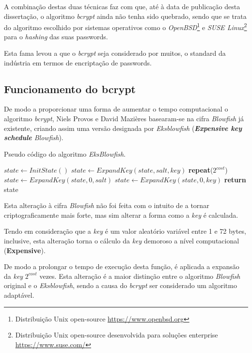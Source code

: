 A combinação destas duas técnicas faz com que, até à data de publicação desta dissertação, o algoritmo \emph{bcrypt} ainda não tenha sido quebrado, sendo que se trata do algoritmo escolhido por sistemas operativos como o \emph{OpenBSD}\footnote{Distribuição Unix open-source \url{https://www.openbsd.org}} e \emph{SUSE Linux}\footnote{Distribuição Unix open-source desenvolvida para soluções enterprise \url{https://www.suse.com/}} para o \emph{hashing} das suas passwords.

Esta fama levou a que o \emph{bcrypt} seja considerado por muitos, o standard da indústria em termos de encriptação de passwords.

\subsection{Funcionamento do bcrypt}

De modo a proporcionar uma forma de aumentar o tempo computacional o algoritmo \emph{bcrypt}, Niels Provos e David Mazières basearam-se na cifra \emph{Blowfish} já existente, criando assim uma versão designada por \emph{Eksblowfish} (\textit{\textbf{Expensive key schedule} Blowfish}).

\begin{algorithm}
    \caption{Pseudo código do algoritmo \emph{EksBlowfish}.}
    \begin{algorithmic}[1]
        \State $state\gets InitState()$
        \State $state\gets ExpandKey(state, salt, key)$
        \State \textbf{repeat}($2^{cost}$)
        \State \indent $state\gets ExpandKey(state, 0, salt)$
        \State \indent $state\gets ExpandKey(state, 0, key)$
        \State \textbf{return} state
    \EndFunction
    \end{algorithmic}
\end{algorithm}

Esta alteração à cifra \emph{Blowfish} não foi feita com o intuito de a tornar criptograficamente mais forte, mas sim alterar a forma como a \emph{key} é calculada.

Tendo em consideração que a \emph{key} é um valor aleatório variável entre 1 e 72 bytes, inclusive, esta alteração torna o cálculo da \emph{key} demoroso a nível computacional (\textbf{Expensive}).

De modo a prolongar o tempo de execução desta função, é aplicada a expansão da \emph{key} $2^{cost}$ vezes. Esta alteração é a maior distinção entre o algoritmo \emph{Blowfish} original e o \emph{Eksblowfish}, sendo a causa do \emph{bcrypt} ser considerado um algoritmo adaptável.

